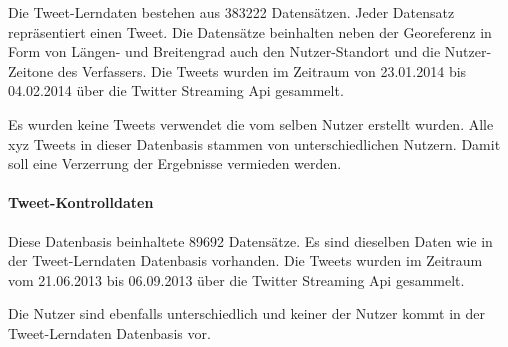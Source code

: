 			Die Tweet-Lerndaten bestehen aus 383222 Datensätzen.
			Jeder Datensatz repräsentiert einen Tweet. 
			Die Datensätze beinhalten neben der Georeferenz in Form von Längen- und Breitengrad auch den Nutzer-Standort und die Nutzer-Zeitone des Verfassers.
			Die Tweets wurden im Zeitraum von 23.01.2014 bis 04.02.2014 über die Twitter Streaming Api gesammelt.

			Es wurden keine Tweets verwendet die vom selben Nutzer erstellt wurden. 
			Alle xyz Tweets in dieser Datenbasis stammen von unterschiedlichen Nutzern. 
			Damit soll eine Verzerrung der Ergebnisse vermieden werden.

		\paragraph{Tweet-Kontrolldaten}

			Diese Datenbasis beinhaltete 89692 Datensätze.
			Es sind dieselben Daten wie in der Tweet-Lerndaten Datenbasis vorhanden.
			Die Tweets wurden im Zeitraum vom 21.06.2013 bis 06.09.2013 über die Twitter Streaming Api gesammelt.

			Die Nutzer sind ebenfalls unterschiedlich und keiner der Nutzer kommt in der Tweet-Lerndaten Datenbasis vor.
